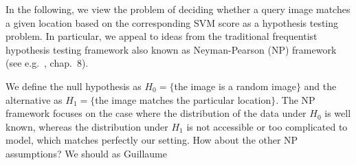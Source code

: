 
      In the following, we view  the problem of deciding whether a query image matches a given location based on the corresponding SVM score as a hypothesis testing problem. In particular, we appeal to ideas from the traditional frequentist hypothesis testing framework also known as Neyman-Pearson (NP) framework (see e.g.~\cite{casella2001statistical}, chap.~8).

      We define the null hypothesis as $H_0=\{$the image is a random image$\}$ and the alternative as $H_1=\{$the image matches the particular location$\}$. The NP framework focuses on the case where the distribution of the data under $H_0$ is well known, whereas the distribution under $H_1$ is not accessible or too complicated to model, which matches perfectly our setting.
      \textcolor{myGrey}{How about the other NP assumptions? We should as Guillaume}


